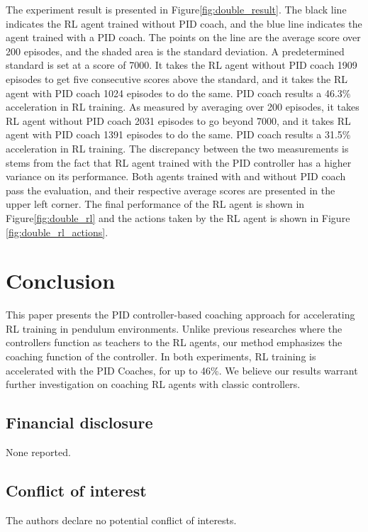 \documentclass[AMS,STIX1COL]{WileyNJD-v2}
\begin{document}
The experiment result is presented in Figure\ref{fig:double_result}. The black line indicates the RL agent trained without PID coach, and the blue line indicates the agent trained with a PID coach. The points on the line are the average score over 200 episodes, and the shaded area is the standard deviation. A predetermined standard is set at a score of 7000. It takes the RL agent without PID coach 1909 episodes to get five consecutive scores above the standard, and it takes the RL agent with PID coach 1024 episodes to do the same. PID coach results a 46.3\% acceleration in RL training. As measured by averaging over 200 episodes, it takes RL agent without PID coach 2031 episodes to go beyond 7000, and it takes RL agent with PID coach 1391 episodes to do the same. PID coach results a 31.5\% acceleration in RL training. The discrepancy between the two measurements is stems from the fact that RL agent trained with the PID controller has a higher variance on its performance. Both agents trained with and without PID coach pass the evaluation, and their respective average scores are presented in the upper left corner. The final performance of the RL agent is shown in Figure\ref{fig:double_rl} and the actions taken by the RL agent is shown in Figure \ref{fig:double_rl_actions}.

\section{Conclusion}

This paper presents the PID controller-based coaching approach for accelerating RL training in pendulum environments. Unlike previous researches where the controllers function as teachers to the RL agents, our method emphasizes the coaching function of the controller. In both experiments, RL training is accelerated with the PID Coaches, for up to 46\%. We believe our results warrant further investigation on coaching RL agents with classic controllers. 

\subsection*{Financial disclosure}

None reported.

\subsection*{Conflict of interest}

The authors declare no potential conflict of interests.


%
\end{document}
